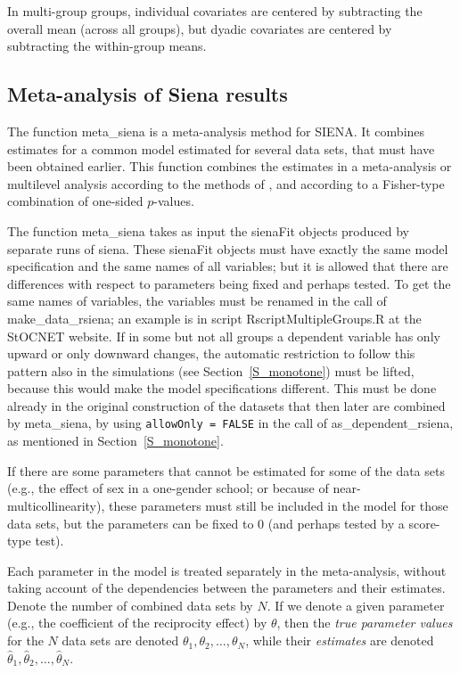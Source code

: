 \documentclass[a4paper,fleqn,11pt]{article}
\newcommand{\+}{\, + \,}
\newcommand{\SN}{{\sf StOCNET }}
\newcommand{\si}{{\sf SIENA}}
\begin{document}
In multi-group groups, individual covariates are centered by subtracting
the overall mean (across all groups), but dyadic covariates are centered
by subtracting the within-group means.



\subsection{Meta-analysis of Siena results}
\label{S_Siena08}

The function \textsf{meta\_siena} is a meta-analysis method for \si.
It combines estimates for a common model
   estimated for several data sets,
   that must have been obtained earlier.
   This function combines
   the estimates in a meta-analysis or multilevel analysis
   according to the methods of \citet{SnijdersBaerveldt03},
   and according to a Fisher-type combination of one-sided $p$-values.

The function  \textsf{meta\_siena} takes as input the \textsf{sienaFit}
objects produced by separate runs of  \textsf{siena}.
These \textsf{sienaFit} objects must have exactly the same model
specification and the same names of all variables; but it is allowed
that there are differences with respect to parameters being fixed
and perhaps tested. To get the same names of variables, the
variables must be renamed in the call of \textsf{make\_data\_rsiena};
an example is in script \textsf{RscriptMultipleGroups.R} at the \SN website.
If in some but not all groups a dependent variable has only upward or
only downward changes, the automatic restriction to follow this pattern also
in the simulations (see Section~\ref{S_monotone}) must be lifted,
because this would make the model specifications different.
This must be done already in the original construction of the datasets that
then later are combined by \textsf{meta\_siena},
by using \texttt{allowOnly = FALSE} in the call of \textsf{as\_dependent\_rsiena},
as mentioned in Section~\ref{S_monotone}.

If there are some parameters that cannot be estimated for some of the data sets
(e.g., the effect of sex in a one-gender school; or because of
near-multicollinearity), these parameters must still be included
in the model for those data sets, but the parameters can be fixed to 0
(and perhaps tested by a score-type test).
\medskip

Each parameter in the model is treated separately
in the meta-analysis, without taking account of the
dependencies between the parameters and their estimates.
Denote the number of combined data sets by $N$.
If we denote a given parameter (e.g., the
coefficient of the reciprocity effect) by $\theta$,
then the \emph{true parameter values} for the
$N$ data sets are denoted $\theta_1, \theta_2, \ldots, \theta_N$,
while their \emph{estimates} are denoted
 $\hat\theta_1, \hat\theta_2, \ldots, \hat\theta_N$.
 \bigskip
\end{document}
